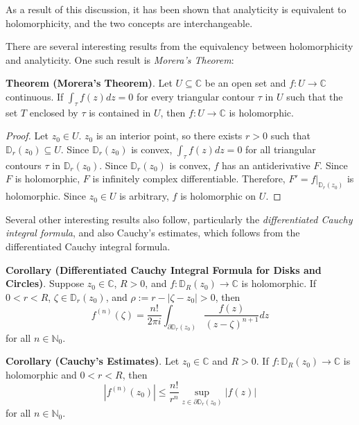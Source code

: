 \begin{framed}
As a result of this discussion, it has been shown that analyticity is equivalent to holomorphicity, and the two concepts are interchangeable.
\end{framed}

\newpage

There are several interesting results from the equivalency between holomorphicity and analyticity. One such result is \textit{Morera's Theorem}: 

\textbf{Theorem (Morera's Theorem)}. Let $U\subseteq\mathbb{C}$ be an open set and $f:U\to\mathbb{C}$ continuous. If $\int_\tau f(z)dz = 0$ for every triangular contour $\tau$ in $U$ such that the set $T$ enclosed by $\tau$ is contained in $U$, then $f:U\to\mathbb{C}$ is holomorphic.

\begin{proof}
    Let $z_0\in U$. $z_0$ is an interior point, so there exists $r>0$ such that $\mathbb{D}_r(z_0)\subseteq U$. Since $\mathbb{D}_r(z_0)$ is convex, $\int_\tau f(z)dz = 0$ for all triangular contours $\tau$ in $\mathbb{D}_r(z_0)$. Since $\mathbb{D}_r(z_0)$ is convex, $f$ has an antiderivative $F$. Since $F$ is holomorphic, $F$ is infinitely complex differentiable. Therefore, $F' = f|_{\mathbb{D}_r(z_0)}$ is holomorphic. Since $z_0\in U$ is arbitrary, $f$ is holomorphic on $U$.
\end{proof}

Several other interesting results also follow, particularly the \textit{differentiated Cauchy integral formula}, and also Cauchy's estimates, which follows from the differentiated Cauchy integral formula.

\textbf{Corollary (Differentiated Cauchy Integral Formula for Disks and Circles)}. Suppose $z_0\in\mathbb{C}$, $R>0$, and $f:\mathbb{D}_R(z_0)\to \mathbb{C}$ is holomorphic. If $0<r<R$, $\zeta\in\mathbb{D}_r(z_0)$, and $\rho :=r-|\zeta-z_0|>0$, then \[f^{(n)}(\zeta) = \frac{n!}{2\pi i} \int_{\partial \mathbb{D}_r(z_0)} \frac{f(z)}{(z-\zeta)^{n+1}} dz\] for all $n\in\mathbb{N}_0$.

\textbf{Corollary (Cauchy's Estimates)}. Let $z_0\in\mathbb{C}$ and $R>0$. If $f:\mathbb{D}_R(z_0)\to\mathbb{C}$ is holomorphic and $0<r<R$, then \[\left|f^{(n)}(z_0)\right| \leq \frac{n!}{r^n} \displaystyle\sup_{z\in\partial\mathbb{D}_r(z_0)} |f(z)|\] for all $n\in\mathbb{N}_0$.


